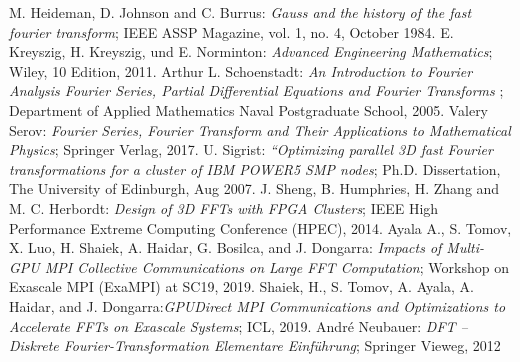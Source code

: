  M. Heideman, D. Johnson and C. Burrus: {\sl Gauss and the history of the fast fourier transform}; IEEE ASSP Magazine, vol. 1, no. 4, October 1984.
 E. Kreyszig, H. Kreyszig, und E. Norminton: {\sl Advanced Engineering Mathematics}; Wiley, 10 Edition, 2011.
 Arthur L. Schoenstadt: {\sl An Introduction to Fourier Analysis Fourier Series, Partial Differential Equations
and Fourier Transforms
}; Department of Applied Mathematics Naval Postgraduate School, 2005.
 Valery Serov: {\sl Fourier Series, Fourier Transform and Their Applications to Mathematical Physics}; Springer Verlag, 2017.
 U. Sigrist: {\sl “Optimizing parallel 3D fast Fourier transformations for a
cluster of IBM POWER5 SMP nodes}; Ph.D. Dissertation, The University of Edinburgh, Aug 2007.
J. Sheng, B. Humphries, H. Zhang and M. C. Herbordt: {\sl Design of 3D FFTs with FPGA Clusters}; IEEE High Performance Extreme Computing Conference (HPEC), 2014.
 Ayala A., S. Tomov, X. Luo, H. Shaiek, A. Haidar, G. Bosilca, and J. Dongarra: {\sl Impacts of Multi-GPU MPI Collective Communications on Large FFT Computation}; Workshop on Exascale MPI (ExaMPI) at SC19, 2019.
 Shaiek, H., S. Tomov, A. Ayala, A. Haidar, and J. Dongarra:{\sl GPUDirect MPI Communications and Optimizations to Accelerate FFTs on Exascale Systems}; ICL, 2019.
André Neubauer: {\sl DFT – Diskrete Fourier-Transformation Elementare Einführung}; Springer Vieweg, 2012
